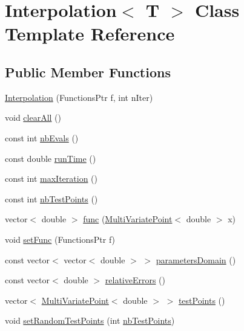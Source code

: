 \hypertarget{class_interpolation}{}\section{Interpolation$<$ T $>$ Class Template Reference}
\label{class_interpolation}
\subsection*{Public Member Functions}
\begin{DoxyCompactItemize}
\item 
\hyperlink{class_interpolation_a486945890aff3b8b7a0e77395e7701de}{Interpolation} (Functions\+Ptr f, int n\+Iter)
\item 
void \hyperlink{class_interpolation_a1456efaffc06c2e9855d40c0fa8f3ade}{clear\+All} ()
\item 
const int \hyperlink{class_interpolation_af62064f49d50af2e7eb2e5d6fca3ef0b}{nb\+Evals} ()
\item 
const double \hyperlink{class_interpolation_a6217fd13a4a5689bd5b264593a444d89}{run\+Time} ()
\item 
const int \hyperlink{class_interpolation_a2f8ae16c6e463b6275c6897cb23c8cfb}{max\+Iteration} ()
\item 
const int \hyperlink{class_interpolation_a463273f663959f84cb189ec6c9b8805b}{nb\+Test\+Points} ()
\item 
vector$<$ double $>$ \hyperlink{class_interpolation_ad60e72c0836ea039de395eb93271deb7}{func} (\hyperlink{class_multi_variate_point}{Multi\+Variate\+Point}$<$ double $>$ x)
\item 
void \hyperlink{class_interpolation_ae86cb1a352b8bb78e86c33c92f9cb68a}{set\+Func} (Functions\+Ptr f)
\item 
const vector$<$ vector$<$ double $>$ $>$ \hyperlink{class_interpolation_af8057630b170cc0cc0fb853e72b61174}{parameters\+Domain} ()
\item 
const vector$<$ double $>$ \hyperlink{class_interpolation_a7601bc7349ed82e28c7e7e3f9d925d18}{relative\+Errors} ()
\item 
vector$<$ \hyperlink{class_multi_variate_point}{Multi\+Variate\+Point}$<$ double $>$ $>$ \hyperlink{class_interpolation_a67f32f77bf277420cffb8ebaaf83e573}{test\+Points} ()
\item 
void \hyperlink{class_interpolation_a5a1e610d2baa723e12fd4c220434413d}{set\+Random\+Test\+Points} (int \hyperlink{class_interpolation_a463273f663959f84cb189ec6c9b8805b}{nb\+Test\+Points})

\end{DoxyCompactItemize}
